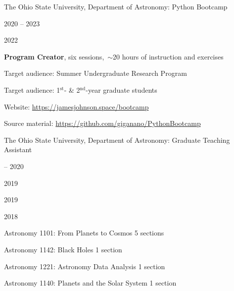 \documentclass[cv.tex]{subfiles}
\begin{document}
{\color{themecolor} \large The Ohio State University, Department of Astronomy:
Python Bootcamp}
\par\noindent
\parbox{0.18\textwidth}{%
	\vspace{2mm}
	\raggedleft
	\null \par
	2020 -- 2023 \par
	2022 \par
	\null \par
	\null
}
\hspace{1mm}
\parbox{0.73\textwidth}{%
	\textbf{Program Creator}, six sessions,~$\sim$20 hours of instruction
	and exercises \par
	Target audience: Summer Undergraduate Research Program \par
	Target audience: 1$^\text{st}$- \& 2$^\text{nd}$-year graduate students \par
	Website: {\small \url{https://jamesjohnson.space/bootcamp}} \par
	Source material: 
	{\small \url{https://github.com/giganano/PythonBootcamp}}
}

\par\null\par\null\par\noindent
{\color{themecolor} \large The Ohio State University, Department of Astronomy:
Graduate Teaching Assistant}
\par\noindent
\parbox{0.18\textwidth}{%
	 -- 2020 \par
	2019 \par
	2019 \par
	2018
}
\hspace{1mm}
\parbox{0.8\textwidth}{%
	\vspace{1mm}
	Astronomy 1101: From Planets to Cosmos \hfill 5 sections \par
	Astronomy 1142: Black Holes \hfill 1 section \par
	Astronomy 1221: Astronomy Data Analysis \hfill 1 section \par
	Astronomy 1140: Planets and the Solar System \hfill 1 section
}
\end{document}
